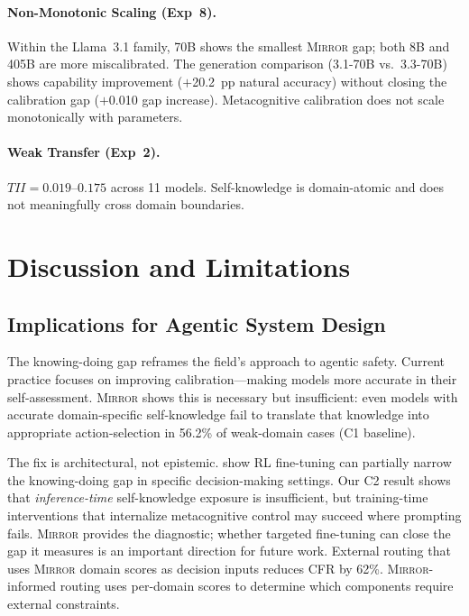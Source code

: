 \documentclass[10pt]{article}
\newcommand{\mirror}{\textsc{Mirror}}
\newcommand{\CFR}{CFR}
\newcommand{\TII}{TII}
\begin{document}
\paragraph{Non-Monotonic Scaling (Exp~8).}
Within the Llama~3.1 family, 70B shows the smallest \mirror{} gap; both 8B and
405B are more miscalibrated. The generation comparison (3.1-70B vs.\ 3.3-70B)
shows capability improvement ($+$20.2~pp natural accuracy) without closing the
calibration gap ($+$0.010 gap increase). Metacognitive calibration does not scale
monotonically with parameters.

\paragraph{Weak Transfer (Exp~2).}
$\TII{} = 0.019$--$0.175$ across 11 models. Self-knowledge is domain-atomic and does not meaningfully cross domain boundaries.

\section{Discussion and Limitations}
\label{sec:discussion}

\subsection{Implications for Agentic System Design}

The knowing-doing gap reframes the field's approach to agentic safety. Current
practice focuses on improving calibration---making models more accurate in their
self-assessment. \mirror{} shows this is necessary but insufficient: even models
with accurate domain-specific self-knowledge fail to translate that knowledge into
appropriate action-selection in 56.2\% of weak-domain cases (C1 baseline).

The fix is architectural, not epistemic.
\citet{schmied2026greedy} show RL fine-tuning can partially narrow the
knowing-doing gap in specific decision-making settings. Our C2 result shows that
\emph{inference-time} self-knowledge exposure is insufficient, but training-time
interventions that internalize metacognitive control may succeed where prompting
fails. \mirror{} provides the diagnostic; whether targeted fine-tuning can close
the gap it measures is an important direction for future work.
External routing that uses \mirror{}
domain scores as decision inputs reduces \CFR{} by 62\%. \mirror{}-informed routing uses per-domain scores to determine which components require external constraints.
\end{document}
